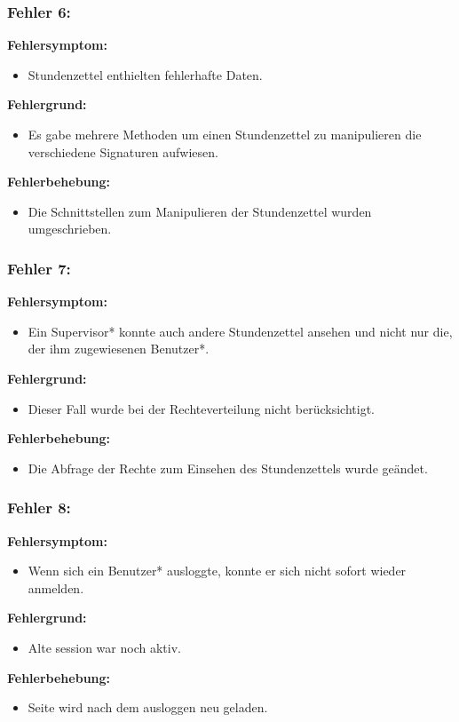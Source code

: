 \subsubsection{Fehler 6:} %
\textbf{Fehlersymptom:}
	\begin{itemize}
		\item Stundenzettel enthielten fehlerhafte Daten.
	\end{itemize}
\textbf{Fehlergrund:}
	\begin{itemize}
		\item Es gabe mehrere Methoden um einen Stundenzettel zu manipulieren die verschiedene Signaturen aufwiesen.
	\end{itemize}
\textbf{Fehlerbehebung:}
	\begin{itemize}
		\item Die Schnittstellen zum Manipulieren der Stundenzettel wurden umgeschrieben.
	\end{itemize}

\subsubsection{Fehler 7:} %
\textbf{Fehlersymptom:}
	\begin{itemize}
		\item Ein Supervisor* konnte auch andere Stundenzettel ansehen und nicht nur die, der ihm zugewiesenen Benutzer*.
	\end{itemize}
\textbf{Fehlergrund:}
	\begin{itemize}
		\item Dieser Fall wurde bei der Rechteverteilung nicht berücksichtigt.
	\end{itemize}
\textbf{Fehlerbehebung:}
	\begin{itemize}
		\item Die Abfrage der Rechte zum Einsehen des Stundenzettels wurde geändet.
	\end{itemize}

\subsubsection{Fehler 8:} %
\textbf{Fehlersymptom:}
	\begin{itemize}
		\item Wenn sich ein Benutzer* ausloggte, konnte er sich nicht sofort wieder anmelden.
	\end{itemize}
\textbf{Fehlergrund:}
	\begin{itemize}
		\item Alte session war noch aktiv.
	\end{itemize}
\textbf{Fehlerbehebung:}
	\begin{itemize}
		\item Seite wird nach dem ausloggen neu geladen.
	\end{itemize}
	
